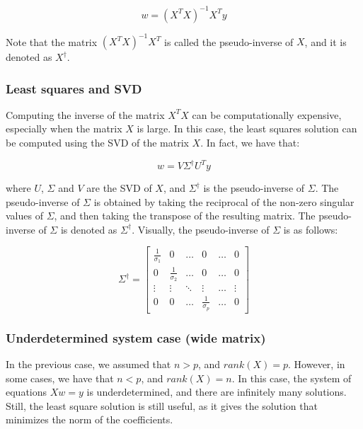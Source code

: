 \begin{equation}
    w = (X^T X)^{-1} X^T y
\end{equation}

Note that the matrix $(X^T X)^{-1} X^T$ is called the pseudo-inverse of $X$, and it is denoted as $X^{\dagger}$.

\subsubsection{Least squares and SVD}

Computing the inverse of the matrix $X^T X$ can be computationally expensive, especially when the matrix $X$ is large.
In this case, the least squares solution can be computed using the SVD of the matrix $X$. In fact, we have that:

\begin{equation}
    w = V \Sigma^{\dagger} U^T y
\end{equation}

where $U$, $\Sigma$ and $V$ are the SVD of $X$, and $\Sigma^{\dagger}$ is the pseudo-inverse of $\Sigma$. The pseudo-inverse
of $\Sigma$ is obtained by taking the reciprocal of the non-zero singular values of $\Sigma$, and then taking the transpose of
the resulting matrix. The pseudo-inverse of $\Sigma$ is denoted as $\Sigma^{\dagger}$. Visually, the pseudo-inverse of $\Sigma$
is as follows:

\begin{equation}
    \Sigma^{\dagger} = \begin{bmatrix}
        \frac{1}{\sigma_1} & 0 & \ldots & 0 & \ldots & 0 \\
        0 & \frac{1}{\sigma_2} & \ldots & 0 & \ldots & 0 \\
        \vdots & \vdots & \ddots & \vdots & \ldots & \vdots \\
        0 & 0 & \ldots & \frac{1}{\sigma_p} & \ldots & 0
    \end{bmatrix}
\end{equation}

\subsubsection{Underdetermined system case (wide matrix)}

In the previous case, we assumed that $n > p$, and $rank(X) = p$. However, in some cases, we have that $n < p$, and
$rank(X) = n$. In this case, the system of equations $X w = y$ is underdetermined, and there are infinitely many solutions.
Still, the least square solution is still useful, as it gives the solution that minimizes the norm of the coefficients.\\

